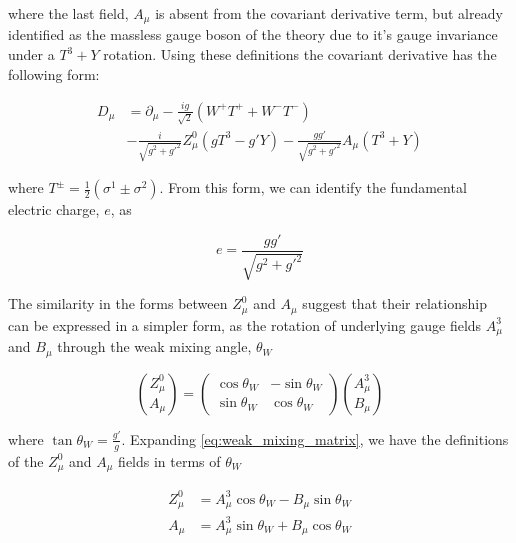 \noindent where the last field, $A_{\mu}$ is absent from the covariant
derivative term, but already identified as the massless gauge boson of
the theory due to it's gauge invariance under a $T^{3}+Y$ rotation.
Using these definitions the covariant derivative has the following
form:

\begin{equation}\label{eq:ewk_covariant_derivative_mass_eigenstates}
\begin{aligned}
D_{\mu} & = \partial_{\mu} - \frac{ig}{\sqrt{2}}(W^{+}T^{+} + W^{-}T^{-}) \\
  &  - \frac{i}{\sqrt{g^{2}+g'^{2}}}Z_{\mu}^{0}(gT^{3} - g'Y) -
    \frac{gg'}{\sqrt{g^{2}+g'^{2}}}A_{\mu}(T^{3}+Y) 
\end{aligned}
\end{equation} 

\noindent where $T^{\pm} = \frac{1}{2}(\sigma^{1}\pm\sigma^{2})$.  From
this form, we can identify the fundamental electric charge, $e$, as

\begin{equation}\label{eq:ewk_electric_charge}
e = \frac{gg'}{\sqrt{g^{2}+g'^{2}}}
\end{equation}

The similarity in the forms between $Z_{\mu}^{0}$ and $A_{\mu}$
suggest that their relationship can be expressed in a simpler form, as
the rotation of underlying gauge fields $A_{\mu}^{3}$ and $B_{\mu}$
through the weak mixing angle, $\theta_{W}$

\begin{equation}\label{eq:weak_mixing_matrix}
\binom{Z_{\mu}^{0}}{A_{\mu}} = 
\begin{pmatrix}
    \cos{\theta_{W}} & -\sin{\theta_{W}} \\
    \sin{\theta_{W}}  &  \cos{\theta_{W}}
  \end{pmatrix}
\binom{A_{\mu}^{3}}{B_{\mu}}
\end{equation}

\noindent where $\tan{\theta_{W}} = \frac{g'}{g}$.  Expanding
\ref{eq:weak_mixing_matrix}, we have the definitions of the
$Z_{\mu}^{0}$ and $A_{\mu}$ fields in terms of $\theta_{W}$

\begin{equation}\label{eq:ewk_Z_A_defined_with_thetaW}
\begin{aligned}
Z_{\mu}^{0} &= A_{\mu}^{3}\cos{\theta_{W}} - B_{\mu}\sin{\theta_{W}}
\\
A_{\mu} & = A_{\mu}^{3}\sin{\theta_{W}} + B_{\mu}\cos{\theta_{W}}
\end{aligned}
\end{equation}

